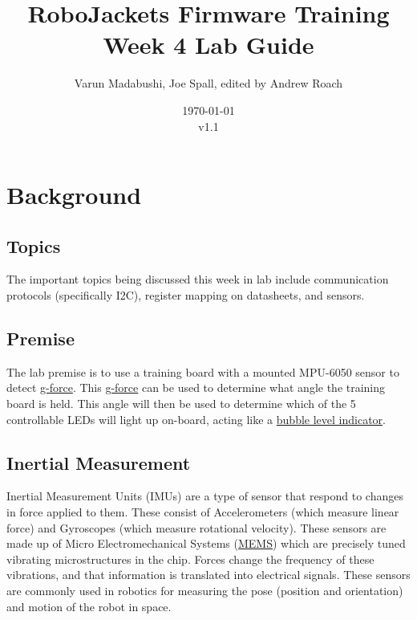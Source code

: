 \documentclass{article}
\title{RoboJackets Firmware Training Week 4 Lab Guide}
\author{Varun Madabushi, Joe Spall, edited by Andrew Roach}
\date{\today\\v1.1}
\begin{document}
\maketitle{}
\setcounter{tocdepth}{2}
\tableofcontents
\pagebreak


\section{Background}
    \subsection{Topics}
        The important topics being discussed this week in lab include communication protocols (specifically I2C), register mapping on datasheets, and sensors.
    \subsection{Premise}
        The lab premise is to use a training board with a mounted MPU-6050 sensor to detect \href{https://en.wikipedia.org/wiki/G-force}{g-force}. This \href{https://upload.wikimedia.org/wikipedia/en/f/f5/G-Force_poster.jpg}{g-force} can be used to determine what angle the training board is held. This angle will then be used to determine which of the 5 controllable LEDs will light up on-board, acting like a \href{https://en.wikipedia.org/wiki/Spirit_level}{bubble level indicator}.
    \subsection{Inertial Measurement}
        Inertial Measurement Units (IMUs) are a type of sensor that respond to changes in force applied to them. These consist of Accelerometers (which measure linear force) and Gyroscopes (which measure rotational velocity). These sensors are made up of Micro Electromechanical Systems (\href{https://en.wikipedia.org/wiki/Microelectromechanical_systems}{MEMS}) which are precisely tuned vibrating microstructures in the chip. Forces change the frequency of these vibrations, and that information is translated into electrical signals. These sensors are commonly used in robotics for measuring the pose (position and orientation) and motion of the robot in space.
        
\end{document}
